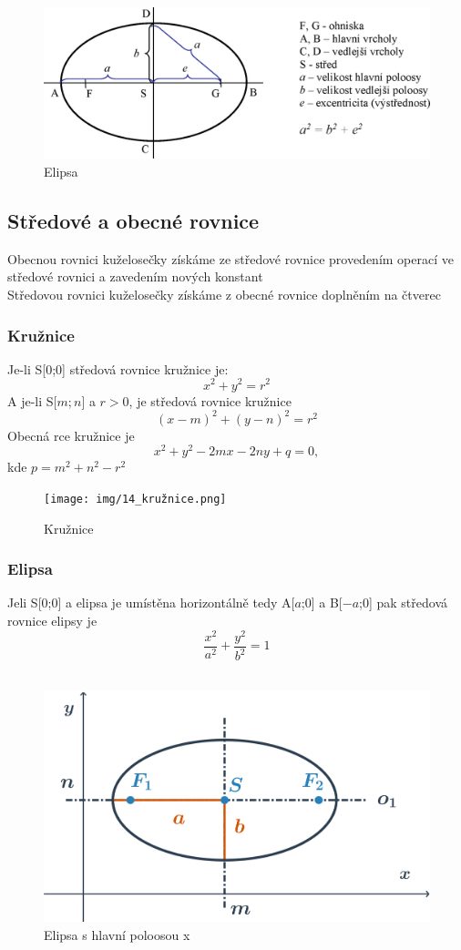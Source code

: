     \begin{figure}[H]
        \centering
        \includegraphics[width=0.6\linewidth]{img/14_elipsa1.png}
        \caption{Elipsa} 
        \label{fig:enter-label}
    \end{figure}    

\subsection {Středové a obecné rovnice}
    Obecnou rovnici kuželosečky získáme ze středové rovnice provedením operací ve středové rovnici a zavedením nových konstant\\
    Středovou rovnici kuželosečky získáme z obecné rovnice doplněním na čtverec
\subsubsection{Kružnice}
    Je-li S[0;0] středová rovnice kružnice je: 
    $$
    x^2 + y^2 = r^2
    $$
    A je-li S[$m;n$] a $r>0$, je středová rovnice kružnice 
    $$
    (x-m)^2 + (y-n)^2 = r^2
    $$
    Obecná rce kružnice je 
    $$
    x^2 + y^2 - 2mx - 2ny+q=0,
    $$
    kde $p=m^2 + n^2-r^2$\\
    \vspace{1em} 
    
    \begin{figure}[H]
        \centering
        \texttt{[image: img/14\_kružnice.png]}
        \caption{Kružnice} 
        \label{fig:enter-label}
    \end{figure}

\subsubsection{Elipsa}
    Jeli S[0;0] a elipsa je umístěna horizontálně tedy A[$a$;0] a B[$-a$;0] pak středová rovnice elipsy je  
    $$
    \frac{x^2}{a^2} + \frac{y^2}{b^2}=1
    $$\\ 
    \vspace{1em}
    
    \begin{figure}[H]
        \centering
        \includegraphics[width=0.5\linewidth]{img/14_elipsa3.png}
        \caption{Elipsa s hlavní poloosou x} 
        \label{fig:enter-label}
    \end{figure}
    
